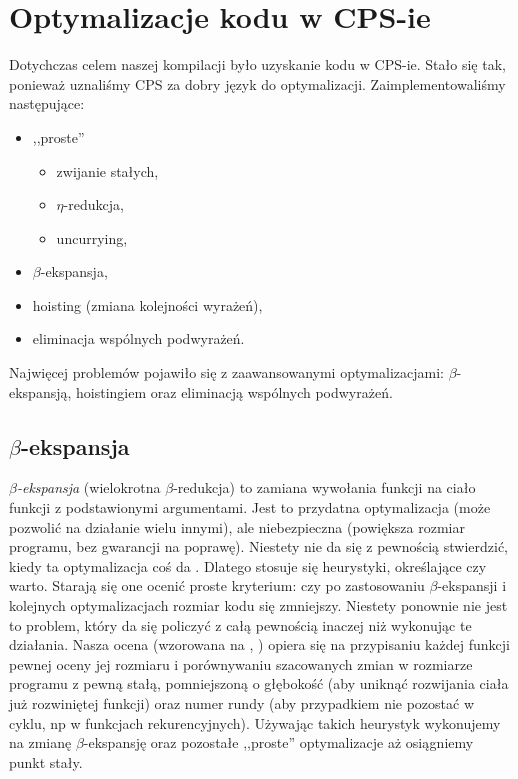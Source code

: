 \documentclass[11pt]{scrartcl}
\begin{document}
\section{Optymalizacje kodu w CPS-ie}
Dotychczas celem naszej kompilacji było uzyskanie kodu w CPS-ie. Stało się tak,
ponieważ uznaliśmy CPS za dobry język do optymalizacji. Zaimplementowaliśmy
następujące:
\begin{itemize}
\item ,,proste'' \begin{itemize}
  \item zwijanie stałych,
  \item $\eta$-redukcja,
  \item uncurrying,
  \end{itemize}
\item $\beta$-ekspansja,
\item hoisting (zmiana kolejności wyrażeń),
\item eliminacja wspólnych podwyrażeń.
\end{itemize}

Najwięcej problemów
pojawiło się z zaawansowanymi optymalizacjami: $\beta$-ekspansją, hoistingiem oraz
eliminacją wspólnych podwyrażeń.

\subsection{$\beta$-ekspansja}
\textit{$\beta$-ekspansja} (wielokrotna $\beta$-redukcja) to zamiana wywołania funkcji na ciało funkcji z
podstawionymi argumentami. Jest to przydatna optymalizacja (może pozwolić na
działanie wielu innymi), ale niebezpieczna (powiększa rozmiar programu, bez
gwarancji na poprawę). Niestety nie da się z pewnością stwierdzić, kiedy ta
optymalizacja coś da \cite{Appel7.1}. Dlatego stosuje się heurystyki, określające czy
warto. Starają się one ocenić proste kryterium: czy po zastosowaniu $\beta$-ekspansji
i kolejnych optymalizacjach rozmiar kodu się zmniejszy. Niestety ponownie nie
jest to problem, który da się policzyć z całą pewnością inaczej niż wykonując te
działania. Nasza ocena (wzorowana na \cite{Appel7.2}, \cite{Appel7.3}) opiera się na przypisaniu
każdej funkcji pewnej oceny jej rozmiaru i porównywaniu szacowanych zmian w
rozmiarze programu z pewną stałą, pomniejszoną o głębokość (aby uniknąć
rozwijania ciała już rozwiniętej funkcji) oraz numer rundy (aby przypadkiem nie
pozostać w cyklu, np w funkcjach rekurencyjnych). Używając takich heurystyk
wykonujemy na zmianę $\beta$-ekspansję oraz pozostałe ,,proste'' optymalizacje
aż osiągniemy punkt stały.
\end{document}
